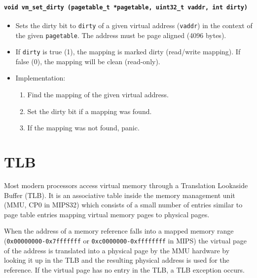 \documentclass[twoside,a4paper]{report}
\makeatletter
\newenvironment{function}[3]{%
\paragraph{\texttt{#1 {\textbf{#2}} (#3)}}%
\index{#2@\texttt{#2}}%
\begin{itemize}%
}{%
\end{itemize}%
}
\makeatother
\begin{document}
\begin{function}{void}{vm\_set\_dirty}{pagetable\_t *pagetable, 
uint32\_t vaddr, int dirty}

\item Sets the dirty bit to \texttt{dirty} of a given virtual address
(\texttt{vaddr}) in the context of the given \texttt{pagetable}. The
address must be page aligned (4096 bytes).

  
\item If \texttt{dirty} is true (1), the mapping is marked dirty
(read/write mapping). If false (0), the mapping will be clean (read-only).

\item Implementation:
\begin{enumerate}

\item Find the mapping of the given virtual address.

\item Set the dirty bit if a mapping was found.

\item If the mapping was not found, panic.

\end{enumerate}
\end{function}



\section{TLB}
\label{sec:tlb}


Most modern processors access virtual memory through a Translation
Lookaside Buffer (TLB). It is an associative table inside the memory
management unit (MMU, CP0 in MIPS32) which consists of a small number of
entries similar to page table entries mapping virtual memory pages to
physical pages.

When the address of a memory reference falls into a mapped memory
range (\texttt{0x00000000-0x7fffffff} or
\texttt{0xc0000000-0xffffffff} in MIPS) 
 the virtual page of the address is
translated into a physical page by the MMU hardware by looking it up
in the TLB and the resulting physical address is used for the
reference. If the virtual page has no entry in the TLB, a TLB
exception occurs.
\end{document}
